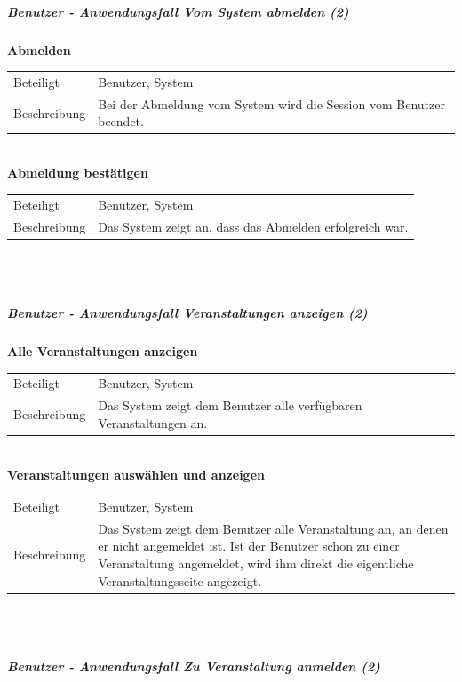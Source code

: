 \documentclass[12pt,a4paper]{article}
\begin{document}
\subparagraph{Benutzer - Anwendungsfall \glqq Vom System abmelden \grqq (2)}\mbox{}

\textbf{Abmelden}\\
\begin{tabular}{l|p{12cm}}
\hline 
Beteiligt & Benutzer, System \\ 
Beschreibung & Bei der Abmeldung vom System wird die Session vom Benutzer beendet.\\ 
\end{tabular}\\

\textbf{Abmeldung bestätigen}\\
\begin{tabular}{l|p{12cm}}
\hline 
Beteiligt & Benutzer, System \\ 
Beschreibung &  Das System zeigt an, dass das Abmelden erfolgreich war. \\ 
\end{tabular}\\\\



\subparagraph{Benutzer - Anwendungsfall \glqq Veranstaltungen anzeigen \grqq (2)}\mbox{}

\textbf{Alle Veranstaltungen anzeigen}\\
\begin{tabular}{l|p{12cm}}
\hline 
Beteiligt & Benutzer, System  \\ 
Beschreibung & Das System zeigt dem Benutzer alle verfügbaren Veranstaltungen an. \\ 
\end{tabular}\\ 

\textbf{Veranstaltungen auswählen und anzeigen}\\
\begin{tabular}{l|p{12cm}}
\hline 
Beteiligt & Benutzer, System \\ 
Beschreibung & Das System zeigt dem Benutzer alle Veranstaltung an, an denen er nicht angemeldet ist. Ist der Benutzer schon zu einer Veranstaltung angemeldet, wird ihm direkt die eigentliche Veranstaltungsseite angezeigt. \\ 
\end{tabular} \\\\

\newpage

\subparagraph{Benutzer - Anwendungsfall \glqq Zu Veranstaltung anmelden \grqq (2)}\mbox{}
\end{document}
